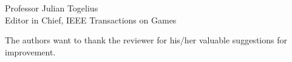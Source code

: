 \documentclass[10pt]{letter} %
\begin{document}
\begin{letter}{Professor Julian Togelius \\ Editor in Chief, IEEE Transactions on Games}
\begin{enumerate}
\begin{itemize}
	\end{itemize}					

The authors want to thank the reviewer for his/her valuable suggestions for improvement.


\end{enumerate}
 


\end{letter}
\end{document}
